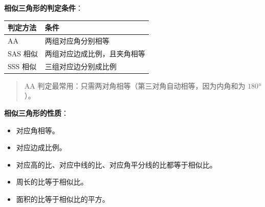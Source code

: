 \textbf{相似三角形的判定条件}：

\begin{center}
\begin{tabular}{ll}
\toprule
判定方法 & 条件 \\
\midrule
AA & 两组对应角分别相等 \\
SAS 相似 & 两组对应边成比例，且夹角相等 \\
SSS 相似 & 三组对应边分别成比例 \\
\bottomrule
\end{tabular}
\end{center}


\begin{quote}
AA 判定最常用：只需两对角相等（第三对角自动相等，因为内角和为 $180°$ ）。
\end{quote}


\textbf{相似三角形的性质}：
\begin{itemize}
  \item 对应角相等。
  \item 对应边成比例。
  \item 对应高的比、对应中线的比、对应角平分线的比都等于相似比。
  \item 周长的比等于相似比。
  \item 面积的比等于相似比的平方。
\end{itemize}


